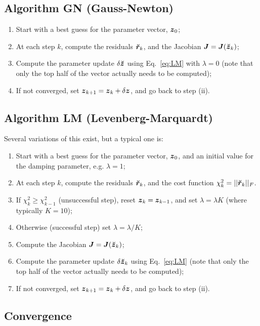 \documentclass[useAMS,usenatbib]{mn2e}
\newcommand{\zz}{\bmath{z}}
\newcommand{\mat}[1]{{\bmath{#1}}}
\newcommand{\JJ}{\mat{J}} %
\newcommand{\AUG}[1]{\bmath{\breve{#1}}}
\newcommand{\Zz}{\AUG{z}}
\newcommand{\Rr}{\AUG{r}}
\numberwithin{equation}{section}
\begin{document}
\subsection{Algorithm GN (Gauss-Newton)}

\begin{enumerate}
\item Start with a best guess for the parameter vector, $\bmath{z}_0$;
\item At each step $k$, compute the residuals $\Rr_k$, and the Jacobian
$\JJ=\JJ(\Zz_k)$;
\item Compute the parameter update $\delta\Zz$ using Eq.~\ref{eq:LM} with $\lambda=0$ (note that only the top half of the vector actually needs to be computed);
\item If not converged, set $\bmath{z}_{k+1}=\bmath{z}_k+\delta\zz$, and go back to step (ii).
\end{enumerate}

\subsection{Algorithm LM (Levenberg-Marquardt)}

Several variations of this exist, but a typical one is:

\begin{enumerate}
\item Start with a best guess for the parameter vector, $\bmath{z}_0$, and an initial value
for the damping parameter, e.g. $\lambda=1$;
\item At each step $k$, compute the residuals $\Rr_k$, and the cost function $\chi^2_k=||\Rr_k||_F$.
\item If $\chi^2_k\ge\chi^2_{k-1}$ (unsuccessful step), reset $\zz_k=\zz_{k-1}$, and set $\lambda=\lambda K$ (where typically $K=10$);
\item Otherwise (successful step) set $\lambda=\lambda/K$;
\item Compute the Jacobian $\JJ=\JJ(\Zz_k)$;
\item Compute the parameter update $\delta\Zz_k$ using Eq.~\ref{eq:LM} (note that only the top half of the vector actually needs to be computed);
\item If not converged, set $\bmath{z}_{k+1}=\bmath{z}_k+\delta\zz$, and go back to step (ii).
\end{enumerate}

\subsection{Convergence}
\end{document}

